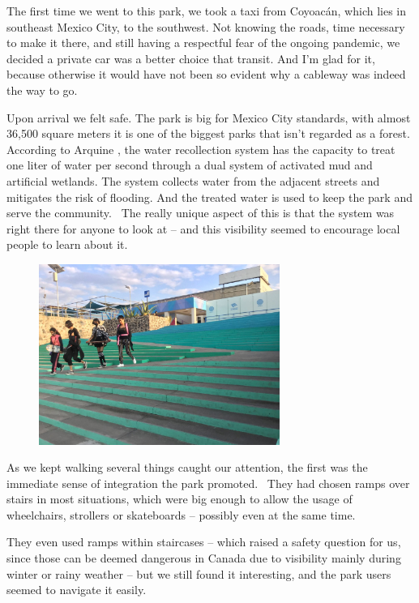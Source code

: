 \documentclass[letter]{ourGreenwayBrand}
\begin{document}
The first time we went to this park, we took a taxi from Coyoacán, which lies in southeast Mexico City, to the southwest. Not knowing the roads, time necessary to make it there, and still having a respectful fear of the ongoing pandemic, we decided a private car was a better choice that transit. And I’m glad for it, because otherwise it would have not been so evident why a cableway was indeed the way to go.

Upon arrival we felt safe. The park is big for Mexico City standards, with almost 36,500 square meters it is one of the biggest parks that isn’t regarded as a forest. According to Arquine , the water recollection system has the capacity to treat one liter of water per second through a dual system of activated mud and artificial wetlands. The system collects water from the adjacent streets and mitigates the risk of flooding. And the treated water is used to keep the park and serve the community.  The really unique aspect of this is that the system was right there for anyone to look at – and this visibility seemed to encourage local people to learn about it.

\begin{figure}[htbp]
  \centering
  \includegraphics[width=0.7\textwidth]{images/IMG_8012-2048x1536.jpg}
\end{figure}

As we kept walking several things caught our attention, the first was the immediate sense of integration the park promoted.  They had chosen ramps over stairs in most situations, which were big enough to allow the usage of wheelchairs, strollers or skateboards – possibly even at the same time.

They even used ramps within staircases – which raised a safety question for us, since those can be deemed dangerous in Canada due to visibility mainly during winter or rainy weather – but we still found it interesting, and the park users seemed to navigate it easily.
\end{document}
